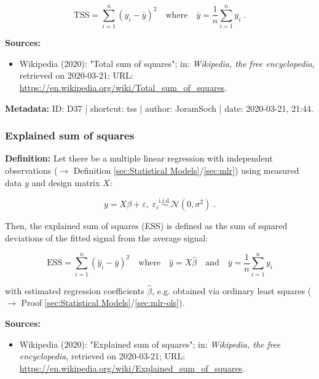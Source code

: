 \documentclass[a4paper,12pt,twoside]{book}
\begin{document}
\begin{equation} \label{eq:tss-tss}
\mathrm{TSS} = \sum_{i=1}^n (y_i - \bar{y})^2 \quad \text{where} \quad \bar{y} = \frac{1}{n} \sum_{i=1}^n y_i \; .
\end{equation}


\vspace{1em}
\textbf{Sources:}
\begin{itemize}
\item Wikipedia (2020): "Total sum of squares"; in: \textit{Wikipedia, the free encyclopedia}, retrieved on 2020-03-21; URL: \url{https://en.wikipedia.org/wiki/Total_sum_of_squares}.
\end{itemize}


\vspace{1em}
\textbf{Metadata:} ID: D37 | shortcut: tss | author: JoramSoch | date: 2020-03-21, 21:44.
\vspace{1em}



\subsubsection[\textit{Explained sum of squares}]{Explained sum of squares} \label{sec:ess}
\setcounter{equation}{0}

\textbf{Definition:} Let there be a multiple linear regression with independent observations ($\rightarrow$ Definition \ref{sec:Statistical Models}/\ref{sec:mlr}) using measured data $y$ and design matrix $X$:

\begin{equation} \label{eq:ess-mlr}
y = X\beta + \varepsilon, \; \varepsilon_i \overset{\mathrm{i.i.d.}}{\sim} \mathcal{N}(0, \sigma^2) \; .
\end{equation}

Then, the explained sum of squares (ESS) is defined as the sum of squared deviations of the fitted signal from the average signal:

\begin{equation} \label{eq:ess-ess}
\mathrm{ESS} = \sum_{i=1}^n (\hat{y}_i - \bar{y})^2 \quad \text{where} \quad \hat{y} = X \hat{\beta} \quad \text{and} \quad \bar{y} = \frac{1}{n} \sum_{i=1}^n y_i
\end{equation}

with estimated regression coefficients $\hat{\beta}$, e.g. obtained via ordinary least squares ($\rightarrow$ Proof \ref{sec:Statistical Models}/\ref{sec:mlr-ols}).


\vspace{1em}
\textbf{Sources:}
\begin{itemize}
\item Wikipedia (2020): "Explained sum of squares"; in: \textit{Wikipedia, the free encyclopedia}, retrieved on 2020-03-21; URL: \url{https://en.wikipedia.org/wiki/Explained_sum_of_squares}.
\end{itemize}
\end{document}
